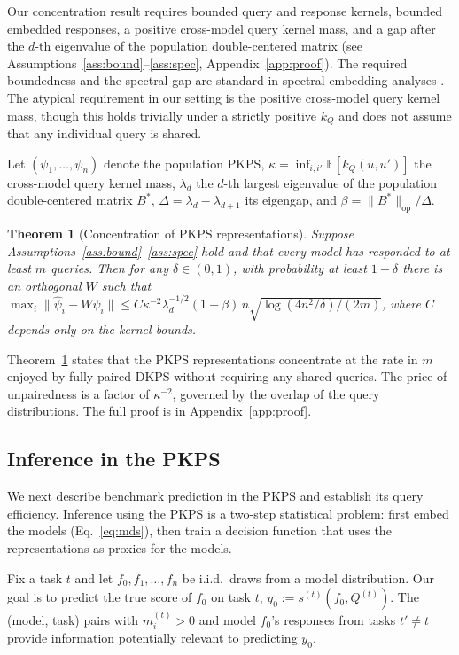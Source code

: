 \documentclass{article}
\newtheorem{theorem}{Theorem}
\theoremstyle{definition}
\theoremstyle{plain}
\newcommand{\PKPS}{PKPS\xspace}
\begin{document}
Our concentration result requires bounded query and response kernels, bounded
embedded responses, a positive cross-model query kernel mass, and a gap after the
$d$-th eigenvalue of the population double-centered matrix (see
Assumptions~\ref{ass:bound}--\ref{ass:spec}, Appendix~\ref{app:proof}).
The required boundedness and the spectral gap are standard in spectral-embedding
analyses \citep{yu2015useful, acharyya2024consistent, acharyya2025concentration}.
The atypical requirement in our setting is the positive cross-model query kernel
mass, though this holds trivially under a strictly positive $k_Q$ and does not assume that any individual query is shared.

Let $(\psi_1,\dots,\psi_n)$ denote the population \PKPS, $\kappa=\inf_{i,i'}\mathbb{E}[k_Q(u,u')]$ the cross-model
query kernel mass, $\lambda_d$ the $d$-th largest eigenvalue of the population
double-centered matrix $B^*$, $\Delta=\lambda_d-\lambda_{d+1}$ its eigengap, and
$\beta=\|B^*\|_{\mathrm{op}}/\Delta$.
\begin{theorem}[Concentration of \PKPS representations]
\label{prop:conc}
Suppose Assumptions~\ref{ass:bound}--\ref{ass:spec} hold and that every model has
responded to at least $m$ queries. Then for any
$\delta\in(0,1)$, with probability at least $1-\delta$ there is an orthogonal $W$ such
that
$\max_i\|\hat\psi_i-W\psi_i\|\le
C\kappa^{-2}\lambda_d^{-1/2}(1+\beta)\,n\sqrt{\log(4n^2/\delta)/(2m)}$,
where $C$ depends only on the kernel bounds.
\end{theorem}

Theorem~\ref{prop:conc} states that the \PKPS representations concentrate at the rate in $ m $ enjoyed by fully paired DKPS \citep{acharyya2025concentration} without requiring any shared queries.
The price of unpairedness is a factor of $\kappa^{-2}$, governed by
the overlap of the query distributions.
The full proof is in Appendix~\ref{app:proof}.

\subsection{Inference in the \PKPS}
\label{sec:qeff}
We next describe benchmark prediction in the \PKPS and establish its query
efficiency.
Inference using the \PKPS is a two-step statistical problem: first embed the
models (Eq.~\eqref{eq:mds}), then train a decision function that uses the
representations as proxies for the models.

Fix a task $t$ and let $f_{0},f_{1},\hdots,f_{n}$ be i.i.d.\ draws from a model
distribution.
Our goal is to predict the true score of $f_{0}$ on task $t$,
$y_{0}:=s^{(t)}(f_{0},Q^{(t)})$.
The (model, task) pairs with $m_{i}^{(t)}>0$ and model $ f_{0}$'s responses from tasks $ t' \neq t $ provide information potentially
relevant to predicting $y_{0}$.
\end{document}
